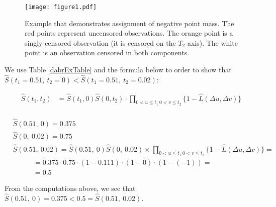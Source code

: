 \documentclass[]{article}
\begin{document}
\begin{figure}[!h]
\caption{Example that demonstrates assignment of negative point mass. The red points represent uncensored observations. The orange point is a singly censored observation (it is censored on the $T_2$ axis). The white point is an observation censored in both components.}
\texttt{[image: figure1.pdf]}
\label{fig:bubbles}
\end{figure}

We use Table \ref{dabrExTable} and the formula below to order to show that $\hat{S}(t_1=0.51,~t_2=0) < \hat{S}(t_1=0.51,~t_2=0.02)$:

	$$
	\begin{aligned}
		\hat{S}(t_1,t_2) &= \hat{S}(t_1,0)\hat{S}(0,t_2)\cdot \prod_{{0<u\leq t_1~0<v\leq t_2}}\{1 - \hat{L}(\Delta u, \Delta v)\}\\
	\end{aligned}
	$$



	$$
	\begin{aligned}
		&\hat{S}(0.51,~0)  = 0.375\\
		&\hat{S}(0,~0.02)  = 0.75\\
		&\hat{S}(0.51,~0.02) = \hat{S}(0.51,~0)\hat{S}(0,~0.02) \times 
		\prod_{{0<u\leq t_1~0<v\leq t_2}}\{1 - \hat{L}(\Delta u, \Delta v)\}=\\
		&~~~~~~~~~~~~~= 0.375 \cdot 0.75 \cdot (1-0.111)\cdot (1-0)\cdot (1-(-1)) = \\
		&~~~~~~~~~~~~~= 0.5
	\end{aligned}
	$$

From the computations above, we see that $\hat{S}(0.51,~0) = 0.375 < 0.5 = \hat{S}(0.51,~0.02)$.
\end{document}
